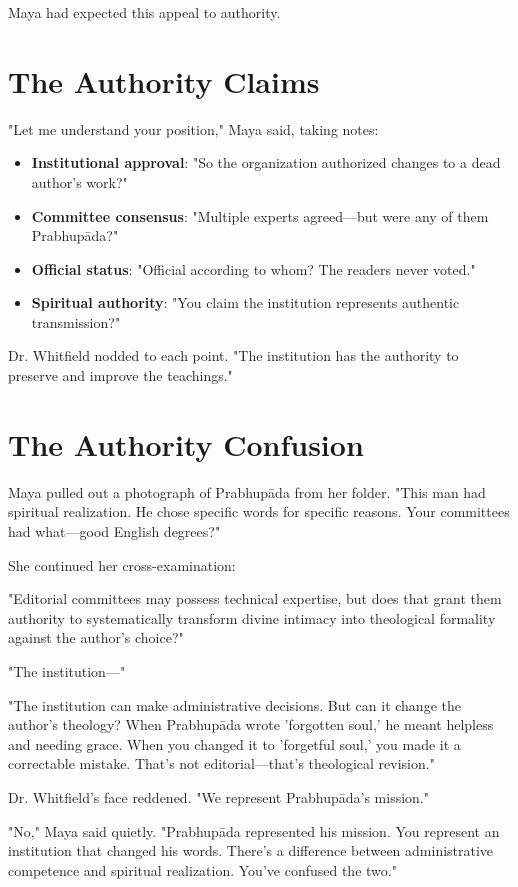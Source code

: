 \documentclass[11pt,twoside]{book}
\begin{document}
Maya had expected this appeal to authority.
\section*{The Authority Claims}
\label{sec:orgd56a9a9}

"Let me understand your position," Maya said, taking notes:

\begin{itemize}
\item \textbf{\textbf{Institutional approval}}: "So the organization authorized changes to a dead author's work?"
\item \textbf{\textbf{Committee consensus}}: "Multiple experts agreed—but were any of them Prabhupāda?"
\item \textbf{\textbf{Official status}}: "Official according to whom? The readers never voted."
\item \textbf{\textbf{Spiritual authority}}: "You claim the institution represents authentic transmission?"
\end{itemize}

Dr. Whitfield nodded to each point. "The institution has the authority to preserve and improve the teachings."
\section*{The Authority Confusion}
\label{sec:orgf8898de}

Maya pulled out a photograph of Prabhupāda from her folder. "This man had spiritual realization. He chose specific words for specific reasons. Your committees had what—good English degrees?"

She continued her cross-examination:

"Editorial committees may possess technical expertise, but does that grant them authority to systematically transform divine intimacy into theological formality against the author's choice?"

"The institution—"

"The institution can make administrative decisions. But can it change the author's theology? When Prabhupāda wrote 'forgotten soul,' he meant helpless and needing grace. When you changed it to 'forgetful soul,' you made it a correctable mistake. That's not editorial—that's theological revision."

Dr. Whitfield's face reddened. "We represent Prabhupāda's mission."

"No," Maya said quietly. "Prabhupāda represented his mission. You represent an institution that changed his words. There's a difference between administrative competence and spiritual realization. You've confused the two."
\end{document}
